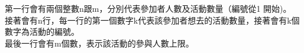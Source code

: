 第一行會有兩個整數n跟m，分別代表參加者人數及活動數量（編號從1 開始)。\\

接著會有n行，每一行的第一個數字k代表該參加者想去的活動數量，接著會有k個數字為活動的編號。\\

最後一行會有m個數，表示該活動的參與人數上限。\\
